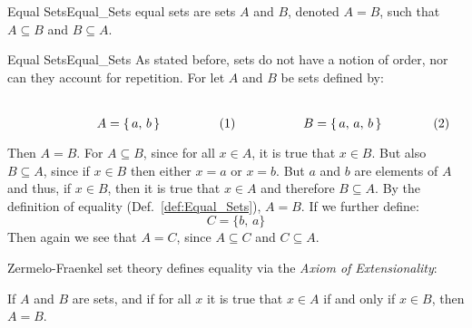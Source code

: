         \begin{ldefinition}{Equal Sets}{Equal_Sets}
            \Glspl{equal set} are sets $A$ and $B$, denoted $A=B$, such that
            $A\subseteq{B}$ and $B\subseteq{A}$.
        \end{ldefinition}
        \begin{lexample}{Equal Sets}{Equal_Sets}
            As stated before, sets do not have a notion of order,
            nor can they account for repetition. For let $A$ and $B$
            be sets defined by:
            \par
            \begin{subequations}
                \begin{minipage}[b]{0.49\textwidth}
                    \centering
                    \begin{equation}
                        A=\{\,a,\,b\,\}
                    \end{equation}
                \end{minipage}
                \hfill
                \begin{minipage}[b]{0.49\textwidth}
                    \centering
                    \begin{equation}
                        B=\{\,a,\,a,\,b\,\}
                    \end{equation}
                \end{minipage}
            \end{subequations}
            \par\vspace{2.5ex}
            Then $A=B$. For $A\subseteq{B}$, since for all $x\in{A}$, it is
            true that $x\in{B}$. But also $B\subseteq{A}$, since if
            $x\in{B}$ then either $x=a$ or $x=b$. But $a$ and $b$ are elements
            of $A$ and thus, if $x\in{B}$, then it is true that $x\in{A}$
            and therefore $B\subseteq{A}$. By the definition of equality
            (Def.~\ref{def:Equal_Sets}), $A=B$. If we further define:
            \begin{equation}
                C=\{b,\,a\}
            \end{equation}
            Then again we see that $A=C$, since $A\subseteq{C}$ and
            $C\subseteq{A}$.
        \end{lexample}
        Zermelo-Fraenkel set theory defines equality via
        the \textit{Axiom of Extensionality}:
        \begin{axiom}
            If $A$ and $B$ are sets, and if for all $x$ it is true that
            $x\in{A}$ if and only if $x\in{B}$, then $A=B$.
        \end{axiom}

